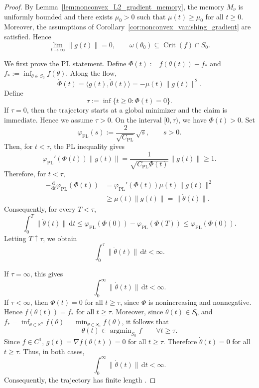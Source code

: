 \documentclass{article} %
\begin{document}
\begin{proof}
By Lemma~\ref{lem:nonconvex_L2_gradient_memory}, the memory $M_\nu$ is uniformly bounded and there exists \(\mu_0>0\) such that $\mu(t)\geq\mu_0$ for all $t\geq0$. Moreover, the assumptions of Corollary~\ref{cor:nonconvex_vanishing_gradient} are satisfied. Hence
\[
    \lim_{t\to\infty}\|g(t)\|=0,
    \qquad
    \omega(\theta_0)\subseteq \operatorname{Crit}(f)\cap S_0.
\]

We first prove the PL statement. Define $\Phi(t):=f(\theta(t))-f_*$ and $f_*:=\inf_{\theta\in S_0}f(\theta)$. Along the flow, 
\[
    \dot\Phi(t)
    =
    \langle g(t),\dot\theta(t)\rangle
    =
    -\mu(t)\|g(t)\|^2.
\]
Define
\[
    \tau:=\inf\{t\geq0:\Phi(t)=0\}.
\]
If \(\tau=0\), then the trajectory starts at a global minimizer and the claim is immediate. Hence we assume \(\tau>0\). On the interval \([0,\tau)\), we have \(\Phi(t)>0\). Set
\[
    \varphi_{\mathrm{PL}}(s)
    :=
    \frac{2}{\sqrt{C_{\mathrm{PL}}}}\sqrt{s},
    \qquad s>0.
\]
Then, for \(t<\tau\), the PL inequality gives
\[
    \varphi_{\mathrm{PL}}'(\Phi(t))\|g(t)\|
    =
    \frac{1}{\sqrt{C_{\mathrm{PL}}\Phi(t)}}\|g(t)\|
    \geq1.
\]
Therefore, for \(t<\tau\),
\[
\begin{aligned}
    -\frac{\mathrm d}{\mathrm dt}
    \varphi_{\mathrm{PL}}(\Phi(t))
    &=
    \varphi_{\mathrm{PL}}'(\Phi(t))\mu(t)\|g(t)\|^2 \\
    &\geq
    \mu(t)\|g(t)\|
    =
    \|\dot\theta(t)\|.
\end{aligned}
\]
Consequently, for every \(T<\tau\),
\[
    \int_0^T \|\dot\theta(t)\|\,\mathrm dt
    \leq
    \varphi_{\mathrm{PL}}(\Phi(0))
    -
    \varphi_{\mathrm{PL}}(\Phi(T))
    \leq
    \varphi_{\mathrm{PL}}(\Phi(0)).
\]
Letting \(T\uparrow\tau\), we obtain
\[
    \int_0^\tau \|\dot\theta(t)\|\,\mathrm dt
    <\infty.
\]

If \(\tau=\infty\), this gives
\[
    \int_0^\infty \|\dot\theta(t)\|\,\mathrm dt<\infty.
\]
If $\tau<\infty$, then $\Phi(t)=0$ for all $t\ge\tau$, since $\Phi$ is nonincreasing and nonnegative. Hence $f(\theta(t))=f_*$ for all $t\ge\tau$. Moreover, since $\theta(t)\in S_0$ and $f_*=\inf_{\theta\in\mathbb R^n} f(\theta) =\min_{\theta\in S_0} f(\theta)$, it follows that
\[
    \theta(t)\in\operatorname{argmin}_{S_0} f
    \qquad \forall t\ge\tau .
\]
Since $f\in C^1$, $g(t)=\nabla f(\theta(t))=0$ for all $t\ge\tau$. Therefore $\dot\theta(t)=0$ for all $t\ge\tau$. Thus, in both cases,
\[
    \int_0^\infty \|\dot\theta(t)\|\,\mathrm dt<\infty .
\]
Consequently, the trajectory has finite length \cite[Theorem~6.27]{Rudin1976}.


\end{proof}
\end{document}
